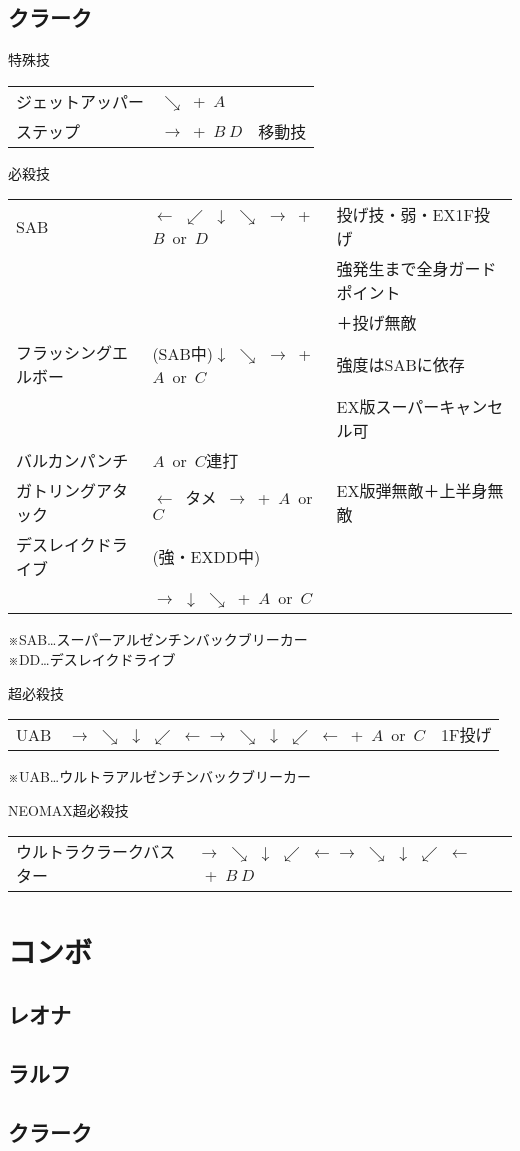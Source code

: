 \documentclass[a4j,11pt]{jarticle}
\def\htame{$\leftarrow$\ タメ\ $\rightarrow$}
\def\hado{$\downarrow$ $\searrow$ $\rightarrow$}%
\def\syoryu{$\rightarrow$ $\downarrow$ $\searrow$}%
\def\yoga{$\leftarrow$ $\swarrow$ $\downarrow$ $\searrow$ $\rightarrow$}%
\def\gyakuyoga{$\rightarrow$ $\searrow$ $\downarrow$ $\swarrow$ $\leftarrow$}%
\begin{document}
\subsection{クラーク}
\begin{itembox}[l]{特殊技}
\begin{tabular}{lll}
ジェットアッパー&$\searrow$\ +\ $A$&\\
ステップ&$\rightarrow$\ +\ $B\ D$&移動技
\end{tabular}
\end{itembox}
\begin{itembox}[l]{必殺技}
\begin{tabular}{lll}
SAB&\yoga\ +\ $B$\ or\ $D$&投げ技・弱・EX1F投げ\\
&&強発生まで全身ガードポイント\\
&&＋投げ無敵\\
フラッシングエルボー&(SAB中)\hado\ +\ $A$\ or\ $C$&強度はSABに依存\\
&&EX版スーパーキャンセル可\\
バルカンパンチ&$A$\ or\ $C$連打&\\
ガトリングアタック&\htame\ +\ $A$\ or\ $C$&EX版弾無敵＋上半身無敵\\
デスレイクドライブ&(強・EXDD中)&\\
&\syoryu\ +\ $A$\ or\ $C$&\\
\end{tabular}
\end{itembox}
※SAB…スーパーアルゼンチンバックブリーカー\\
※DD…デスレイクドライブ\\
\begin{itembox}[l]{超必殺技}
\begin{tabular}{lll}
UAB&\gyakuyoga\gyakuyoga\ +\ $A$\ or\ $C$&1F投げ
\end{tabular}
\end{itembox}
※UAB…ウルトラアルゼンチンバックブリーカー\\
\begin{itembox}[l]{NEOMAX超必殺技}
\begin{tabular}{lll}
ウルトラクラークバスター&\gyakuyoga\gyakuyoga\ +\ $B\ D$&
\end{tabular}
\end{itembox}
\newpage
\section{コンボ}
\subsection{レオナ}
\newpage
\subsection{ラルフ}
\newpage
\subsection{クラーク}
\newpage
\end{document}
